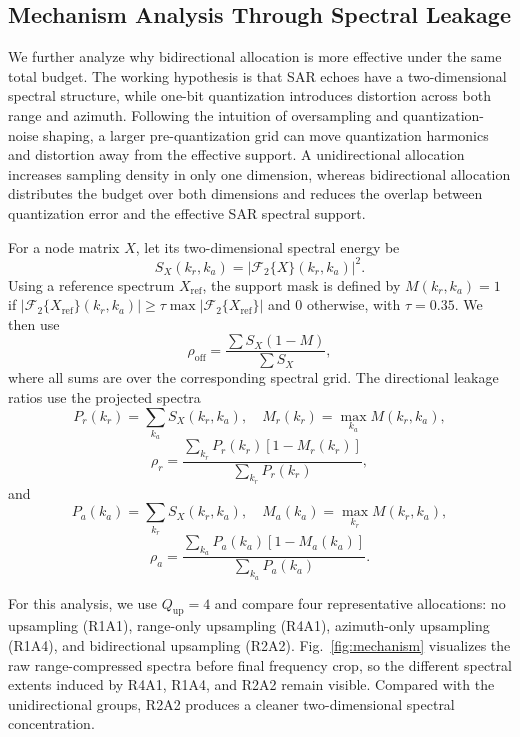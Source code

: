 \documentclass[conference]{IEEEtran}
\begin{document}
\subsection{Mechanism Analysis Through Spectral Leakage}

We further analyze why bidirectional allocation is more effective under the same total budget. The working hypothesis is that SAR echoes have a two-dimensional spectral structure, while one-bit quantization introduces distortion across both range and azimuth. Following the intuition of oversampling and quantization-noise shaping, a larger pre-quantization grid can move quantization harmonics and distortion away from the effective support. A unidirectional allocation increases sampling density in only one dimension, whereas bidirectional allocation distributes the budget over both dimensions and reduces the overlap between quantization error and the effective SAR spectral support.

For a node matrix $X$, let its two-dimensional spectral energy be
\begin{equation}
S_X(k_r,k_a)=|\mathcal{F}_2\{X\}(k_r,k_a)|^2 .
\end{equation}
Using a reference spectrum $X_{\mathrm{ref}}$, the support mask is defined by $M(k_r,k_a)=1$ if $|\mathcal{F}_2\{X_{\mathrm{ref}}\}(k_r,k_a)|\geq \tau \max |\mathcal{F}_2\{X_{\mathrm{ref}}\}|$ and $0$ otherwise, with $\tau=0.35$. We then use
\begin{equation}
\rho_{\mathrm{off}}=\frac{\sum S_X(1-M)}{\sum S_X},
\end{equation}
where all sums are over the corresponding spectral grid. The directional leakage ratios use the projected spectra
\begin{equation}
P_r(k_r)=\sum_{k_a}S_X(k_r,k_a), \quad
M_r(k_r)=\max_{k_a}M(k_r,k_a),
\end{equation}
\begin{equation}
\rho_r=
\frac{\sum_{k_r}P_r(k_r)[1-M_r(k_r)]}{\sum_{k_r}P_r(k_r)},
\end{equation}
and
\begin{equation}
P_a(k_a)=\sum_{k_r}S_X(k_r,k_a), \quad
M_a(k_a)=\max_{k_r}M(k_r,k_a),
\end{equation}
\begin{equation}
\rho_a=
\frac{\sum_{k_a}P_a(k_a)[1-M_a(k_a)]}{\sum_{k_a}P_a(k_a)}.
\end{equation}

For this analysis, we use $Q_{\mathrm{up}}=4$ and compare four representative allocations: no upsampling (R1A1), range-only upsampling (R4A1), azimuth-only upsampling (R1A4), and bidirectional upsampling (R2A2). Fig.~\ref{fig:mechanism} visualizes the raw range-compressed spectra before final frequency crop, so the different spectral extents induced by R4A1, R1A4, and R2A2 remain visible. Compared with the unidirectional groups, R2A2 produces a cleaner two-dimensional spectral concentration.
\end{document}

